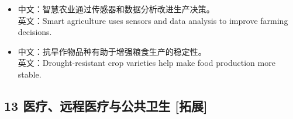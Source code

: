 \documentclass[a4paper,11pt,UTF8,fontset=none]{ctexart}
\begin{document}
\endgroup
\vspace{-2pt}

\par

\begin{itemize}[leftmargin=1.7em,itemsep=1pt,parsep=0pt,topsep=2pt]
\item \noindent 中文：智慧农业通过传感器和数据分析改进生产决策。\\ 英文：Smart agriculture uses sensors and data analysis to improve farming decisions.\par


\item \noindent 中文：抗旱作物品种有助于增强粮食生产的稳定性。\\ 英文：Drought-resistant crop varieties help make food production more stable.\par


\end{itemize}

\subsection{13 医疗、远程医疗与公共卫生 {\color{AccentBlue} [拓展]}}
\end{document}
